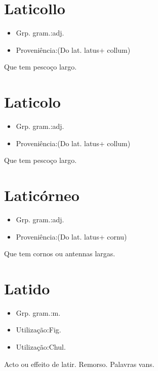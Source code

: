 \section{Laticollo}
\begin{itemize}
\item {Grp. gram.:adj.}
\end{itemize}
\begin{itemize}
\item {Proveniência:(Do lat. \textunderscore latus\textunderscore  + \textunderscore collum\textunderscore )}
\end{itemize}
Que tem pescoço largo.
\section{Laticolo}
\begin{itemize}
\item {Grp. gram.:adj.}
\end{itemize}
\begin{itemize}
\item {Proveniência:(Do lat. \textunderscore latus\textunderscore  + \textunderscore collum\textunderscore )}
\end{itemize}
Que tem pescoço largo.
\section{Laticórneo}
\begin{itemize}
\item {Grp. gram.:adj.}
\end{itemize}
\begin{itemize}
\item {Proveniência:(Do lat. \textunderscore latus\textunderscore  + \textunderscore cornu\textunderscore )}
\end{itemize}
Que tem cornos ou antennas largas.
\section{Latido}
\begin{itemize}
\item {Grp. gram.:m.}
\end{itemize}
\begin{itemize}
\item {Utilização:Fig.}
\end{itemize}
\begin{itemize}
\item {Utilização:Chul.}
\end{itemize}
Acto ou effeito de latir.
Remorso.
Palavras vans.
